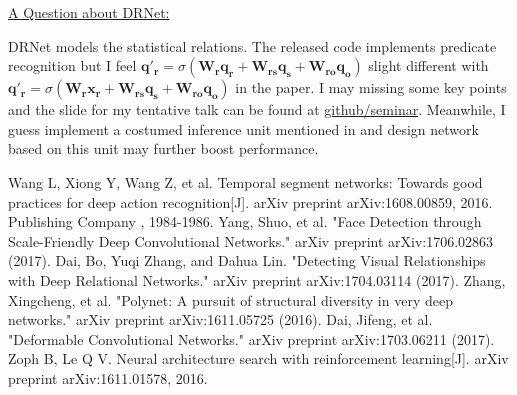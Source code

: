 \documentclass[11pt,a4paper,colorlinks,linkcolor=brown]{moderncv}        %
\begin{document}
	
	\underline{A Question about DRNet:}	
	
	DRNet \cite{drnet} models the statistical relations. The released code implements predicate recognition but I feel $\mathbf{q'_r}=\sigma(\mathbf{W_r} \mathbf{q_r} + \mathbf{W_{rs}} \mathbf{q_s} + \mathbf{W_{ro}} \mathbf{q_o})$ slight different with  $\mathbf{q'_r}=\sigma(\mathbf{W_r} \mathbf{x_r} + \mathbf{W_{rs}} \mathbf{q_s} + \mathbf{W_{ro}} \mathbf{q_o})$ in the paper. I may missing some key points and the slide for my tentative talk can be found at \href{https://github.com/luzai/Curriculum_Artificial_Intelligence/blob/master/seminar_July3/VisualRelationDetection.pdf}{github/seminar}. Meanwhile, I guess implement a costumed inference unit mentioned in \cite{drnet} and  design   network based on this unit may further boost performance.
	
	
	\makeletterclosing
	\begin{thebibliography}{999}
		 Wang L, Xiong Y, Wang Z, et al. Temporal segment networks: Towards good practices for deep action recognition[J]. arXiv preprint arXiv:1608.00859, 2016.
		Publishing Company , 1984-1986.
		 Yang, Shuo, et al. "Face Detection through Scale-Friendly Deep Convolutional Networks." arXiv preprint arXiv:1706.02863 (2017).
		 Dai, Bo, Yuqi Zhang, and Dahua Lin. "Detecting Visual Relationships with Deep Relational Networks." arXiv preprint arXiv:1704.03114 (2017).
		 Zhang, Xingcheng, et al. "Polynet: A pursuit of structural diversity in very deep networks." arXiv preprint arXiv:1611.05725 (2016).
		 Dai, Jifeng, et al. "Deformable Convolutional Networks." arXiv preprint arXiv:1703.06211 (2017).  
		 Zoph B, Le Q V. Neural architecture search with reinforcement learning[J]. arXiv preprint arXiv:1611.01578, 2016.
	\end{thebibliography}
	
\end{document}
